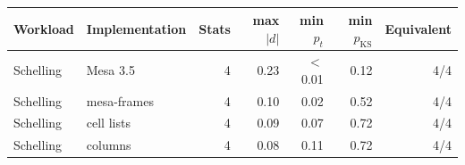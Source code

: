 \begin{tabular}{llrrrrr}
\toprule
Workload & Implementation & Stats & max $|d|$ & min $p_{t}$ & min $p_{\mathrm{KS}}$ & Equivalent \\
\midrule
Schelling & Mesa 3.5 & 4 & 0.23 & $<$0.01 & 0.12 & 4/4 \\
Schelling & mesa-frames & 4 & 0.10 & 0.02 & 0.52 & 4/4 \\
Schelling & cell lists & 4 & 0.09 & 0.07 & 0.72 & 4/4 \\
Schelling & columns & 4 & 0.08 & 0.11 & 0.72 & 4/4 \\
\bottomrule
\end{tabular}
